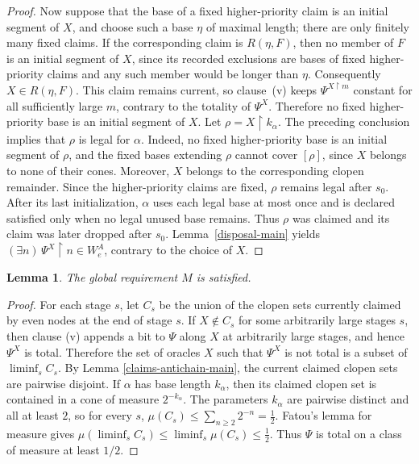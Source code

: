 \documentclass[10pt,a4paper]{amsart}
\newtheorem{lemma}[theorem]{Lemma}
\begin{document}
\begin{proof}
Now suppose that the base of a fixed higher-priority claim is an initial
segment of $X$, and choose such a base $\eta$ of maximal length; there are only
finitely many fixed claims.  If the corresponding claim is $R(\eta,F)$, then
no member of $F$ is an initial segment of $X$, since its recorded exclusions
are bases of fixed higher-priority claims and any such member would be longer
than $\eta$.
Consequently $X\in R(\eta,F)$.  This claim remains current, so clause~(v)
keeps $\Psi^{X\upharpoonright m}$ constant for all sufficiently large $m$,
contrary to the totality of $\Psi^X$.  Therefore no fixed higher-priority base
is an initial segment of $X$.
Let $\rho=X\upharpoonright k_\alpha$.  The preceding conclusion implies that
$\rho$ is legal for $\alpha$.  Indeed, no fixed higher-priority base is an
initial segment of $\rho$, and the fixed bases extending $\rho$ cannot cover
$[\rho]$, since $X$ belongs to none of their cones.  Moreover, $X$ belongs to
the corresponding clopen remainder.  Since the higher-priority claims are
fixed, $\rho$ remains legal after $s_0$.  After its last initialization,
$\alpha$ uses each legal base at most once and is declared satisfied only when
no legal unused base remains.  Thus $\rho$ was claimed and its claim was later
dropped after $s_0$.  Lemma~\ref{disposal-main} yields
$(\exists n)\,\Psi^X\upharpoonright n\in W_e^A$, contrary to the choice of $X$.
\end{proof}

\begin{lemma}\label{15}
The global requirement $M$ is satisfied.
\end{lemma}

\begin{proof}
For each stage $s$, let $C_s$ be the union of the clopen sets currently claimed
by even nodes at the end of stage $s$.  If $X\notin C_s$ for some arbitrarily large
stages $s$, then clause (v) appends a bit to $\Psi$ along $X$ at arbitrarily large
stages, and hence $\Psi^X$ is total.  Therefore the set of oracles $X$ such that $\Psi^X$ is not total is a subset of $\liminf_s C_s$.
By Lemma \ref{claims-antichain-main}, the current claimed clopen sets are
pairwise disjoint.  If $\alpha$ has base length $k_\alpha$, then its claimed
clopen set is contained in a cone of measure $2^{-k_\alpha}$.  The parameters
$k_\alpha$ are pairwise distinct and all at least $2$, so for every $s$, $\mu(C_s)\leq\sum_{n\geq2}2^{-n}=\frac12$.
Fatou's lemma for measure gives $\mu(\liminf_s C_s)
      \leq \liminf_s \mu(C_s)
      \leq \frac12$.
Thus $\Psi$ is total on a class of measure at least $1/2$.
\end{proof}
\end{document}
